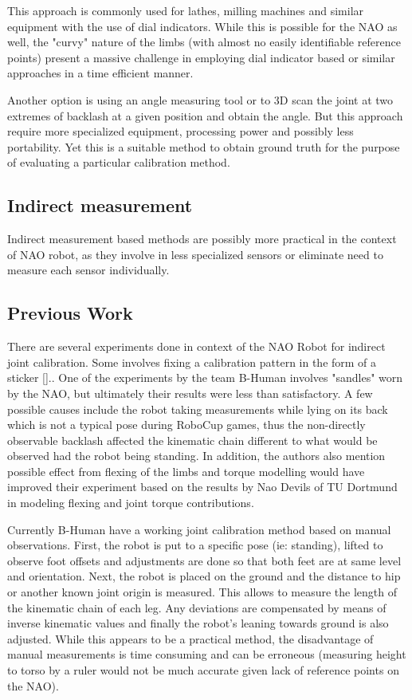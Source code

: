 \documentclass[english, printversion, nomenclature, notitle]{tuvisionthesis} %
\begin{document}
This approach is commonly used for lathes, milling machines and similar equipment with the use of dial indicators. While this is possible for the NAO as well, the "curvy" nature of the limbs (with almost no easily identifiable reference points) present a massive challenge in employing dial indicator based or similar approaches in a time efficient manner.

Another option is using an angle measuring tool or to 3D scan the joint at  two extremes of backlash at a given position and obtain the angle. But this approach require more specialized equipment, processing power and possibly less portability. Yet this is a suitable method to obtain ground truth for the purpose of evaluating a particular calibration method. 

\subsection{Indirect measurement}
Indirect measurement based methods are possibly more practical in the context of NAO robot, as they involve in less specialized sensors or eliminate need to measure each sensor individually.
\subsection{Previous Work}

There are several experiments done in context of the NAO Robot for indirect joint calibration. Some involves fixing a calibration pattern in the form of a sticker [].. One of the experiments by the team B-Human involves "sandles" worn by the NAO, but ultimately their results were less than satisfactory. A few possible causes include the robot taking measurements while lying on its back which is not a typical pose during RoboCup games, thus the non-directly observable backlash affected the kinematic chain different to what would be observed had the robot being standing.  In addition, the authors also mention possible effect from flexing of the limbs and torque modelling would have improved their experiment based on the results by Nao Devils of TU Dortmund in modeling flexing and joint torque contributions. 

Currently B-Human have a working joint calibration method based on manual observations. First, the robot is put to a specific pose (ie: standing), lifted to observe foot offsets and adjustments are done so that both feet are at same level and orientation. Next, the robot is placed on the ground and the distance to hip or another known joint origin is measured. This allows to measure the length of the kinematic chain of each leg. Any deviations are compensated by means of inverse kinematic values and finally the robot's leaning  towards ground is also adjusted. While this appears to be a practical method, the disadvantage of manual measurements is time consuming and can be erroneous (measuring height to torso by a ruler would not be much accurate given lack of reference points on the NAO).
\end{document}
